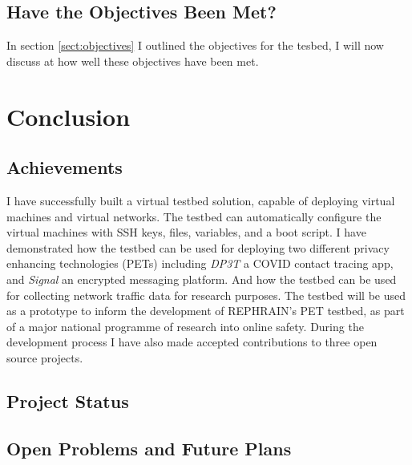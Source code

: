 \documentclass[
    author={Jacob Daniel Halsey},
    supervisor={Prof. Awais Rashid},
    degree={BSc},
    title={Building a Testbed for Evaluating Privacy Enhancing Technologies  (PETs)},
    subtitle={},
    type={software development},
    year={2021}
]{dissertation}
\begin{document}
\section{Have the Objectives Been Met?}

In section \ref{sect:objectives} I outlined the objectives for the tesbed, I will now discuss
at how well these objectives have been met. \\


\chapter{Conclusion}
\label{chap:conclusion}

\section{Achievements}

I have successfully built a virtual testbed solution, capable of deploying
virtual machines and virtual networks. The testbed can automatically configure
the virtual machines with SSH keys, files, variables, and a boot script.
I have demonstrated how the testbed can be used for deploying two different privacy enhancing technologies
(PETs) including \emph{DP3T} a COVID contact tracing app, and \emph{Signal} an encrypted messaging platform.
And how the testbed can be used for collecting network traffic data for research purposes.
The testbed will be used as a prototype to inform the development of REPHRAIN's PET testbed, 
as part of a major national programme of research into online safety.
During the development process I have also made accepted contributions to three open source projects.

\section{Project Status}


\section{Open Problems and Future Plans}


\backmatter
\printbibliography
\end{document}
